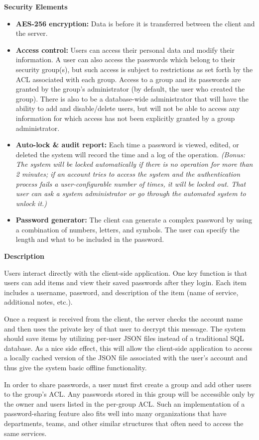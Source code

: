 \documentclass[11pt, letterpaper]{article}
\newcommand{\ProposalSection}[1]
{\noindent\textbf{#1}}
\begin{document}
\ProposalSection{Security Elements}
\begin{itemize} \itemsep1pt \parskip0pt 
\item \textbf{AES-256 encryption: }Data is before it is transferred between the client and the server.
\item \textbf{Access control: }Users can access their personal data and modify their information. A user can also access the passwords which belong to their security group(s), but such access is subject to restrictions as set forth by the ACL associated with each group. Access to a group and its passwords are granted by the group’s administrator (by default, the user who created the group). There is also to be a database-wide administrator that will have the ability to add and disable/delete users, but will not be able to access any information for which access has not been explicitly granted by a group administrator.
\item \textbf{Auto-lock \& audit report: }Each time a password is viewed, edited, or deleted the system will record the time and a log of the operation. \textit{(Bonus: The system will be locked automatically if there is no operation for more than 2 minutes; if an account tries to access the system and the authentication process fails a user-configurable number of times, it will be locked out. That user can ask a system administrator or go through the automated system to unlock it.)}
\item \textbf{Password generator: }The client can generate a complex password by using a combination of numbers, letters, and symbols. The user can specify the length and what to be included in the password.
\end{itemize}

\ProposalSection{Description}

Users interact directly with the client-side application. One key function is that users can add items and view their saved passwords after they login. Each item includes a username, password, and description of the item (name of service, additional notes, etc.).

Once a request is received from the client, the server checks the account name and then uses the private key of that user to decrypt this message. The system should save items by utilizing per-user JSON files instead of a traditional SQL database. As a nice side effect, this will allow the client-side application to access a locally cached version of the JSON file associated with the user’s account and thus give the system basic offline functionality.

In order to share passwords, a user must first create a group and add other users to the group’s ACL. Any passwords stored in this group will be accessible only by the owner and users listed in the per-group ACL. Such an implementation of a password-sharing feature also fits well into many organizations that have departments, teams, and other similar structures that often need to access the same services.
\end{document}
